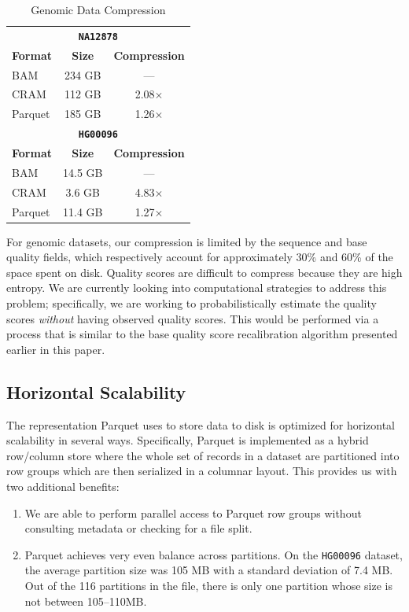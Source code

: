\documentclass[masters]{ucbthesis}
\begin{document}
\begin{table}[h]
\caption{Genomic Data Compression}
\label{tab:genomic-compression}
\begin{center}
\begin{tabular}{ l c c }
\hline
\multicolumn{3}{c}{\textbf{\texttt{NA12878}}} \\
\textbf{Format} & \textbf{Size} & \textbf{Compression} \\
\hline
\hline
BAM & 234 GB & --- \\
CRAM & 112 GB & 2.08$\times$ \\
Parquet & 185 GB & 1.26$\times$ \\
\hline
\multicolumn{3}{c}{\textbf{\texttt{HG00096}}} \\
\textbf{Format} & \textbf{Size} & \textbf{Compression} \\
\hline
\hline
BAM & 14.5 GB & --- \\
CRAM & 3.6 GB & 4.83$\times$ \\
Parquet & 11.4 GB & 1.27$\times$ \\
\hline
\end{tabular}
\end{center}
\end{table}

For genomic datasets, our compression is limited by the sequence and base quality fields, which respectively
account for approximately 30\% and 60\% of the space spent on disk. Quality scores are difficult to compress
because they are high entropy. We are currently looking into computational strategies to address this problem;
specifically, we are working to probabilistically estimate the quality scores \emph{without} having observed quality
scores. This would be performed via a process that is similar to the base quality score recalibration algorithm
presented earlier in this paper.

\subsection{Horizontal Scalability}
\label{sec:horizontal-scalability}

The representation Parquet uses to store data to disk is optimized for horizontal scalability in several ways.
Specifically, Parquet is implemented as a hybrid row/column store where the whole set of records in a dataset
are partitioned into row groups which are then serialized in a columnar layout. This provides us with two additional
benefits:

\begin{enumerate}
\item We are able to perform parallel access to Parquet row groups without consulting metadata or checking for
a file split.
\item Parquet achieves very even balance across partitions. On the \texttt{HG00096} dataset, the average
partition size was 105 MB with a standard deviation of 7.4 MB. Out of the 116 partitions in the file, there is only
one partition whose size is not between 105--110MB.
\end{enumerate}
\end{document}
